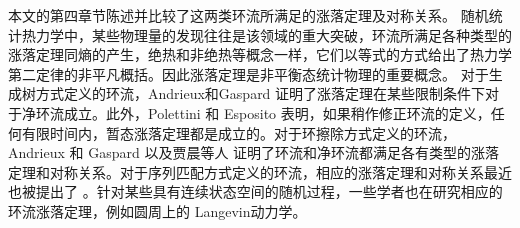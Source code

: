 本文的第四章节陈述并比较了这两类环流所满足的涨落定理及对称关系。
随机统计热力学中，某些物理量的发现往往是该领域的重大突破，环流所满足各种类型的涨落定理同熵的产生，绝热和非绝热等概念一样\cite{annurev-conmatphys,Seifert_2012,VANDENBROECK20156}，它们以等式的方式给出了热力学第二定律的非平凡概括。因此涨落定理是非平衡态统计物理的重要概念。
对于生成树方式定义的环流，Andrieux和Gaspard \cite{andrieux2007fluctuation}证明了涨落定理在某些限制条件下对于净环流成立。此外，Polettini 和 Esposito \cite{polettini2014transient}表明，如果稍作修正环流的定义，任何有限时间内，暂态涨落定理都是成立的。对于环擦除方式定义的环流，Andrieux 和 Gaspard \cite{andrieux2007network}以及贾晨等人 \cite{jia2016cycle} 证明了环流和净环流都满足各有类型的涨落定理和对称关系。对于序列匹配方式定义的环流，相应的涨落定理和对称关系最近也被提出了 \cite{pietzonka2021cycle}。针对某些具有连续状态空间的随机过程，一些学者也在研究相应的环流涨落定理，例如圆周上的 Langevin动力学\cite{ge2017cycle}。

